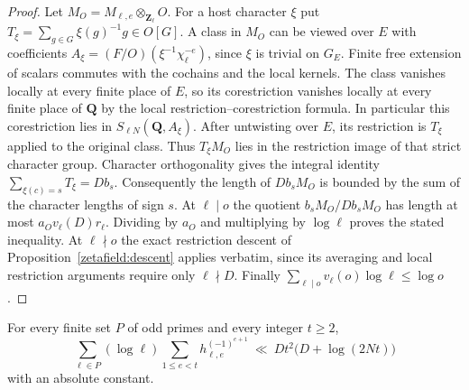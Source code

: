\begin{proof}
Let \(M_O=M_{\ell,e}\otimes_{\mathbf Z_\ell}O\). For a host character
\(\xi\) put \(T_\xi=\sum_{g\in G}\xi(g)^{-1}g\in O[G]\).
A class in \(M_O\) can be viewed over \(E\) with coefficients
\(A_\xi=(F/O)(\xi^{-1}\chi_\ell^{-e})\), since \(\xi\) is trivial on
\(G_E\). Finite free extension of scalars commutes with the cochains
and the local kernels. The class vanishes locally at every finite
place of \(E\), so its corestriction vanishes locally at every finite
place of \(\mathbf Q\) by the local restriction--corestriction formula.
In particular this corestriction lies in \(S_{\ell N}(\mathbf Q,A_\xi)\).
After untwisting over \(E\), its restriction is \(T_\xi\) applied to
the original class. Thus \(T_\xi M_O\) lies in the restriction image
of that strict character group. Character orthogonality gives the
integral identity \(\sum_{\xi(c)=s}T_\xi=D b_s\). Consequently the
length of \(D b_s M_O\) is bounded by the sum of the character lengths
of sign \(s\). At \(\ell\mid o\) the quotient \(b_s M_O/D b_s M_O\)
has length at most \(a_Ov_\ell(D)r_\ell\). Dividing by \(a_O\) and
multiplying by \(\log\ell\) proves the stated inequality. At
\(\ell\nmid o\) the exact restriction descent of
Proposition~\ref{zetafield:descent} applies verbatim, since its
averaging and local restriction arguments require only \(\ell\nmid D\).
Finally \(\sum_{\ell\mid o}v_\ell(o)\log\ell\le\log o\).
\end{proof}

\begin{theorem}\label{addo:opposite}
For every finite set \(P\) of odd primes and every integer \(t\ge2\),
\[
 \sum_{\ell\in P}(\log\ell)\sum_{1\le e<t} h_{\ell,e}^{(-1)^{e+1}}
     \ \ll\ D t^2\bigl(D+\log(2Nt)\bigr)
\]
with an absolute constant.
\end{theorem}

